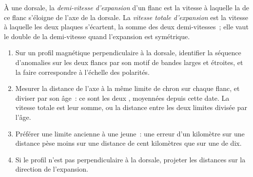 \begin{omfigure}
\par{}
\label{fig:b1:plate-kinematics:stripes}
\end{omfigure}

\begin{definition}\label{def:b1:plate-kinematics:spreading-rate}
À une dorsale, la \emph{demi-vitesse d'expansion} d'un
flanc est la vitesse à laquelle la  de ce flanc s'éloigne de l'axe de la
dorsale. La \emph{vitesse totale d'expansion} est la vitesse à
laquelle les deux plaques s'écartent, la somme des deux demi-vitesses~; elle vaut le double de la
demi-vitesse quand l'expansion est symétrique.
\end{definition}

\begin{method}\label{met:b1:plate-kinematics:rate}
\begin{enumerate}
  \item Sur un profil magnétique perpendiculaire à la dorsale, identifier la séquence
        d'anomalies sur les deux flancs par son motif de bandes larges et étroites,
        et la faire correspondre à l'échelle des polarités.
  \item Mesurer la distance de l'axe à la même limite de chron sur chaque
        flanc, et diviser par son âge~: ce sont les deux ,
        moyennées depuis cette date. La vitesse totale est leur somme, ou la distance
        entre les deux limites divisée par l'âge.
  \item Préférer une limite ancienne à une jeune~: une erreur d'un kilomètre sur une
        distance pèse moins sur une distance de cent kilomètres que sur une
        de dix.
  \item Si le profil n'est pas perpendiculaire à la dorsale, projeter les distances
        sur la direction de l'expansion.
\end{enumerate}
\end{method}


